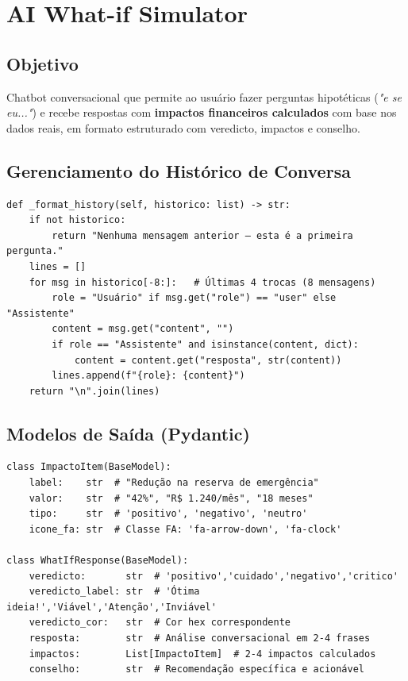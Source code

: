 \documentclass[12pt, a4paper, oneside]{report}
\begin{document}
\section{AI What-if Simulator}

\subsection{Objetivo}

Chatbot conversacional que permite ao usuário fazer perguntas hipotéticas (\textit{"e se eu..."}) e recebe respostas com \textbf{impactos financeiros calculados} com base nos dados reais, em formato estruturado com veredicto, impactos e conselho.

\subsection{Gerenciamento do Histórico de Conversa}

\begin{lstlisting}[style=python, caption={finance/whatif\_simulator.py — Formatação do histórico}]
def _format_history(self, historico: list) -> str:
    if not historico:
        return "Nenhuma mensagem anterior — esta é a primeira pergunta."
    lines = []
    for msg in historico[-8:]:   # Últimas 4 trocas (8 mensagens)
        role = "Usuário" if msg.get("role") == "user" else "Assistente"
        content = msg.get("content", "")
        if role == "Assistente" and isinstance(content, dict):
            content = content.get("resposta", str(content))
        lines.append(f"{role}: {content}")
    return "\n".join(lines)
\end{lstlisting}

\subsection{Modelos de Saída (Pydantic)}

\begin{lstlisting}[style=python, caption={finance/whatif\_simulator.py — Modelos Pydantic}]
class ImpactoItem(BaseModel):
    label:    str  # "Redução na reserva de emergência"
    valor:    str  # "42%", "R$ 1.240/mês", "18 meses"
    tipo:     str  # 'positivo', 'negativo', 'neutro'
    icone_fa: str  # Classe FA: 'fa-arrow-down', 'fa-clock'

class WhatIfResponse(BaseModel):
    veredicto:       str  # 'positivo','cuidado','negativo','critico'
    veredicto_label: str  # 'Ótima ideia!','Viável','Atenção','Inviável'
    veredicto_cor:   str  # Cor hex correspondente
    resposta:        str  # Análise conversacional em 2-4 frases
    impactos:        List[ImpactoItem]  # 2-4 impactos calculados
    conselho:        str  # Recomendação específica e acionável
\end{lstlisting}
\end{document}
